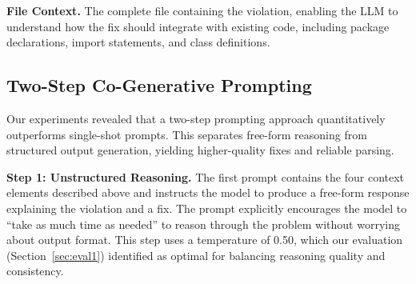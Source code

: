 \documentclass[conference]{IEEEtran}
\begin{document}
\textbf{File Context.} The complete file containing the violation, 
enabling the LLM to understand how the fix should integrate with 
existing code, including package declarations, import statements, and 
class definitions.

\subsection{Two-Step Co-Generative Prompting}

Our experiments revealed that a two-step prompting approach quantitatively outperforms single-shot prompts. This separates free-form reasoning from structured output generation, yielding higher-quality fixes and reliable parsing.

\textbf{Step 1: Unstructured Reasoning.} The first prompt contains the four context elements described above and instructs the model to produce a free-form response explaining the violation and a fix. The prompt explicitly encourages the model to ``take as much time as needed'' to reason through the problem without worrying about output format. This step uses a temperature of 0.50, which our evaluation (Section~\ref{sec:eval1}) identified as optimal for balancing reasoning quality and consistency.
\end{document}
